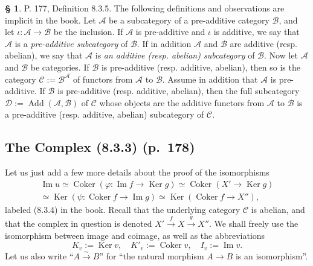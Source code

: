 \documentclass[12pt]{article}
\theoremstyle{remark}
\theoremstyle{definition}
\newtheorem{s}[thm]{\S}
\newcommand{\cc}{\mathcal}
\newcommand{\C}{\mathcal C}
\DeclareMathOperator{\Ad}{Add}
\DeclareMathOperator{\Coker}{Coker}
\DeclareMathOperator{\Ima}{Im}
\DeclareMathOperator{\Ker}{Ker}
\begin{document}
\begin{s} 
P. 177, Definition 8.3.5. The following definitions and observations are implicit in the book. Let $\cc A$ be a subcategory of a pre-additive category $\cc B$, and let $\iota:\cc A\to \cc B$ be the inclusion. If $\cc A$ is pre-additive and $\iota$ is additive, we say that $\cc A$ is a {\em pre-additive subcategory} of $\cc B$. If in addition $\cc A$ and $\cc B$ are additive (resp. abelian), we say that $\cc A$ is {\em an additive (resp. abelian) subcategory} of $\cc B$. Now let $\cc A$ and $\cc B$ be categories. If $\cc B$ is pre-additive (resp. additive, abelian), then so is the category $\cc C:=\cc B^\cc A$ of functors from $\cc A$ to $\cc B$. Assume in addition that $\cc A$ is pre-additive. If $\cc B$ is pre-additive (resp. additive, abelian), then the full subcategory $\cc D:=\Ad(\cc A,\cc B)$ of $\cc C$ whose objects are the additive functors from $\cc A$ to $\cc B$ is a pre-additive (resp. additive, abelian) subcategory of $\cc C$.
\end{s}
%
\subsection{The Complex (8.3.3) (p.~178)}
%
Let us just add a few more details about the proof of the isomorphisms
\begin{equation}\label{834}
\begin{split}
\Ima u\simeq\Coker(\varphi:\Ima f\to\Ker g)\simeq\Coker(X'\to\Ker g)\\ 
\simeq\Ker(\psi:\Coker f\to\Ima g)\simeq\Ker(\Coker f\to X''),
\end{split}
\end{equation}
labeled (8.3.4) in the book. Recall that the underlying category $\C$ is abelian, and that the complex in question is denoted $X'\xrightarrow{f}X\xrightarrow{g}X''$. We shall freely use the isomorphism between image and coimage, as well as the abbreviations 
$$
K_v:=\Ker v,\quad K'_v:=\Coker v,\quad I_v:=\Ima v.
$$ 
Let us also write ``$A\overset{\sim}{\to}B$'' for ``the natural morphism $A\to B$ is an isomorphism''. 
\end{document}
